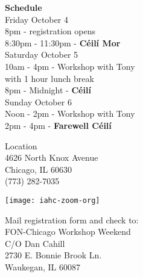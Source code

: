 \documentclass[12pt,
notumble,
letterpaper]{leaflet}
\begin{document}
\begin{flushleft}
{\large \textbf{Schedule}}\\ 
\vspace*{2em}
Friday October 4\\
\hspace*{3em}  8pm  - registration opens\\
\hspace*{3em}  8:30pm  - 11:30pm  - \textbf{C\'{e}il\'{i} Mor}\\

Saturday October 5\\
\hspace*{3em}  10am - 4pm  - Workshop with Tony\\
\hspace*{3em}  {\small with 1 hour lunch break}\\

\hspace*{3em}  8pm - Midnight - \textbf{C\'{e}il\'{i}}\\

Sunday October 6\\
\hspace*{3em}  Noon - 2pm  - Workshop  with Tony \\

 \hspace*{3em} 2pm - 4pm - \textbf{Farewell C\'{e}il\'{i}}\\
\end{flushleft}

Location\\
4626 North Knox Avenue\\
Chicago, IL 60630\\
(773) 282-7035
%

\vspace*{0.05em}
\begin{center}
\texttt{[image: iahc-zoom-org]}
\end{center}

\pagebreak

\pagebreak

\begin{landscape}

\hspace*{15em}
\begin{minipage}[t]{\textwidth}
\vspace{0pt}
Mail registration form and check to:\\

{\large
FON-Chicago Workshop Weekend\\
C/O Dan Cahill\\
2730 E. Bonnie Brook Ln.\\ Waukegan, IL 60087
}
\end{minipage}
\end{landscape}
\end{document}
